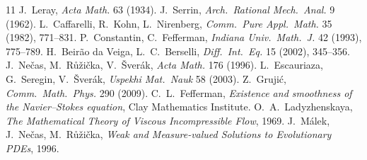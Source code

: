 \documentclass[11pt]{article}
\begin{document}
\begin{thebibliography}{11}
 J.~Leray, \textit{Acta Math.} 63 (1934).
 J.~Serrin, \textit{Arch.\ Rational Mech.\ Anal.} 9 (1962).
 L.~Caffarelli, R.~Kohn, L.~Nirenberg,
\textit{Comm.\ Pure Appl.\ Math.} 35 (1982), 771--831.
 P.~Constantin, C.~Fefferman,
\textit{Indiana Univ.\ Math.\ J.} 42 (1993), 775--789.
 H.~Beir\~ao da Veiga, L.~C.~Berselli,
\textit{Diff.\ Int.\ Eq.} 15 (2002), 345--356.
 J.~Ne\v{c}as, M.~R\r{u}\v{z}i\v{c}ka, V.~\v{S}ver\'ak,
\textit{Acta Math.} 176 (1996).
 L.~Escauriaza, G.~Seregin, V.~\v{S}ver\'ak,
\textit{Uspekhi Mat.\ Nauk} 58 (2003).
 Z.~Gruji\'c, \textit{Comm.\ Math.\ Phys.} 290 (2009).
 C.~L.~Fefferman,
\textit{Existence and smoothness of the Navier--Stokes equation},
Clay Mathematics Institute.
 O.~A.~Ladyzhenskaya,
\textit{The Mathematical Theory of Viscous Incompressible Flow}, 1969.
 J.~M\'alek, J.~Ne\v{c}as, M.~R\r{u}\v{z}i\v{c}ka,
\textit{Weak and Measure-valued Solutions to Evolutionary PDEs}, 1996.
\end{thebibliography}
\end{document}

